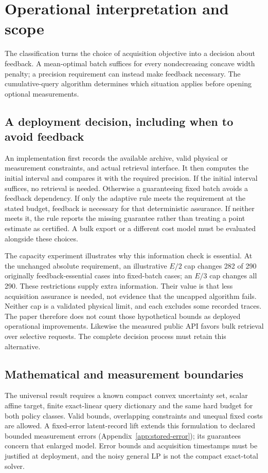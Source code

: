 \section{Operational interpretation and scope}
The classification turns the choice of acquisition objective into a
decision about feedback. A mean-optimal batch suffices for every
nondecreasing concave width penalty; a precision requirement can instead
make feedback necessary. The cumulative-query algorithm determines which
situation applies before opening optional measurements.

\subsection{A deployment decision, including when to avoid feedback}
An implementation first records the available archive, valid physical or
measurement constraints, and actual retrieval interface. It then computes
the initial interval and compares it with the required precision. If the
initial interval suffices, no retrieval is needed. Otherwise a guaranteeing
fixed batch avoids a feedback dependency. If only the adaptive rule meets
the requirement at the stated budget, feedback is necessary for that
deterministic assurance. If neither meets it, the rule reports the missing
guarantee rather than treating a point estimate as certified. A bulk export
or a different cost model must be evaluated alongside these choices.

The capacity experiment illustrates why this information check is essential.
At the unchanged absolute requirement, an illustrative $E/2$ cap changes
282 of 290 originally feedback-essential cases into fixed-batch cases;
an $E/3$ cap changes all 290. These restrictions supply extra information.
Their value is that less acquisition assurance is needed, not evidence
that the uncapped algorithm fails. Neither cap is a validated physical
limit, and each excludes some recorded traces. The paper therefore does
not count those hypothetical bounds as deployed operational improvements.
Likewise the measured public API favors bulk retrieval over selective
requests. The complete decision process must retain this alternative.

\subsection{Mathematical and measurement boundaries}
The universal result requires a known compact convex uncertainty set,
scalar affine target, finite exact-linear query dictionary and the same
hard budget for both policy classes. Valid bounds, overlapping constraints
and unequal fixed costs are allowed. A fixed-error latent-record lift
extends this formulation to declared bounded measurement errors
(Appendix~\ref{app:stored-error}); its guarantees concern that enlarged
model. Error bounds and acquisition timestamps must be justified at
deployment, and the noisy general LP is not the compact exact-total solver.

